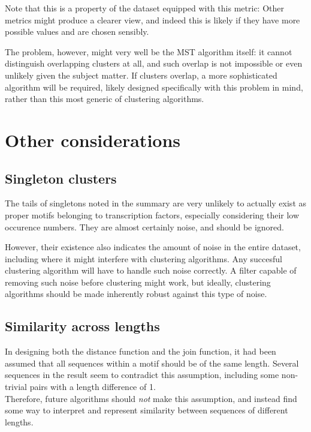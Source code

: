 \documentclass[fleqn]{book}
\begin{document}
Note that this is a property of the dataset equipped with this metric:
Other metrics might produce a clearer view, and indeed this is likely if
they have more possible values and are chosen sensibly.

The problem, however, might very well be the MST algorithm itself: it
cannot distinguish overlapping clusters at all, and such overlap is not
impossible or even unlikely given the subject matter. If clusters
overlap, a more sophisticated algorithm will be required, likely
designed specifically with this problem in mind, rather than this most
generic of clustering algorithms.

\section{Other considerations}\label{other-considerations}

\subsection{Singleton clusters}\label{singleton-clusters}

The tails of singletons noted in the summary are very unlikely to
actually exist as proper motifs belonging to transcription factors,
especially considering their low occurence numbers. They are almost
certainly noise, and should be ignored.

However, their existence also indicates the amount of noise in the
entire dataset, including where it might interfere with clustering
algorithms. Any succesful clustering algorithm will have to handle such
noise correctly. A filter capable of removing such noise before
clustering might work, but ideally, clustering algorithms should be made
inherently robust against this type of noise.

\subsection{Similarity across lengths}\label{similarity-across-lengths}

In designing both the distance function and the join function, it had
been assumed that all sequences within a motif should be of the same
length. Several sequences in the result seem to contradict this
assumption, including some non-trivial pairs with a length difference of
1.\\
Therefore, future algorithms should \emph{not} make this assumption, and
instead find some way to interpret and represent similarity between
sequences of different lengths.
\end{document}
